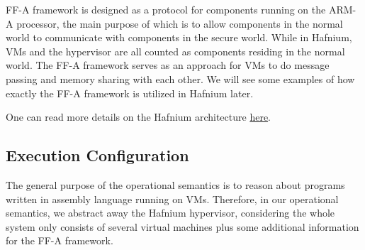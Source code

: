 \documentclass[a4paper]{article}
\begin{document}
FF-A framework is designed as a protocol for components running on the ARM-A
processor, the main purpose of which is to allow components in the normal world
to communicate with components in the secure world. While in Hafnium, VMs and
the hypervisor are all counted as components residing in the normal world. The
FF-A framework serves as an approach for VMs to do message passing and
memory sharing with each other. We will see some examples of how exactly the
FF-A framework is utilized in Hafnium later.

One can read more details on the Hafnium architecture
\href{https://review.trustedfirmware.org/plugins/gitiles/hafnium/hafnium/+/HEAD/docs/Architecture.md}{here}.

\subsection{Execution Configuration}
 The general purpose of the operational
semantics is to reason about programs written in assembly language running on
VMs. Therefore, in our operational semantics, we abstract away the Hafnium
hypervisor, considering the whole system only consists of several virtual
machines plus some additional information for the FF-A framework.
\end{document}
